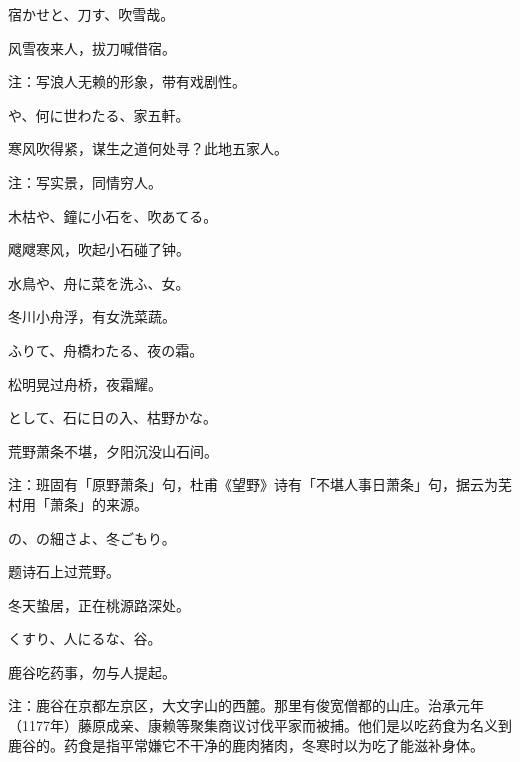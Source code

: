 \begin{haiku}
    {\FH 宿かせと、刀す、吹雪哉。}

    {\FK 风雪夜来人，拔刀喊借宿。}

    {\FT 注：写浪人无赖的形象，带有戏剧性。}
\end{haiku}

\begin{haiku}
    {\FH {}や、何に世わたる、家五軒。}

    {\FK 寒风吹得紧，谋生之道何处寻？此地五家人。}

    {\FT 注：写实景，同情穷人。}
\end{haiku}

\begin{haiku}
    {\FH 木枯や、鐘に小石を、吹あてる。}

    {\FK 飕飕寒风，吹起小石碰了钟。}
\end{haiku}

\begin{haiku}
    {\FH 水鳥や、舟に菜を洗ふ、女。}

    {\FK 冬川小舟浮，有女洗菜蔬。}
\end{haiku}

\begin{haiku}
    {\FH {}ふりて、舟橋わたる、夜の霜。}

    {\FK 松明晃过舟桥，夜霜耀。}
\end{haiku}

\begin{haiku}
    {\FH {}として、石に日の入、枯野かな。}

    {\FK 荒野萧条不堪，夕阳沉没山石间。}

    {\FT 注：班固有「原野萧条」句，杜甫《望野》诗有「不堪人事日萧条」句，据云为芜村用「萧条」的来源。}
\end{haiku}

\begin{haiku}
    {\FH {}の、の細さよ、冬ごもり。}

    {\FK 题诗石上过荒野。}

    {\FK 冬天蛰居，正在桃源路深处。}
\end{haiku}

\begin{haiku}
    {\FH くすり、人にるな、谷。}

    {\FK 鹿谷吃药事，勿与人提起。}

    {\FT 注：鹿谷在京都左京区，大文字山的西麓。那里有俊宽僧都的山庄。治承元年（1177年）藤原成亲、康赖等聚集商议讨伐平家而被捕。他们是以吃药食为名义到鹿谷的。药食是指平常嫌它不干净的鹿肉猪肉，冬寒时以为吃了能滋补身体。}
\end{haiku}

